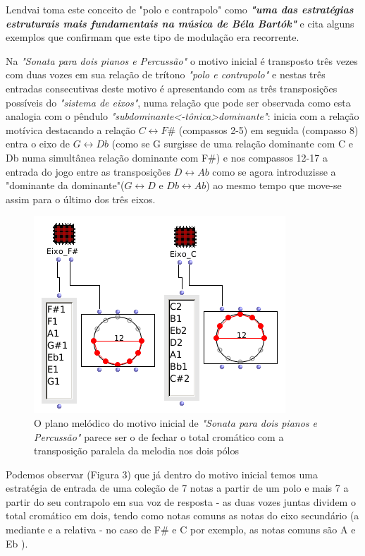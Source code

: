 \documentclass[
	12pt,				%
	openright,			%
	twoside,			%
	a4paper,			%
	english,			%
	french,				%
	spanish,			%
	brazil				%
	]{abntex2}
\begin{document}
Lendvai toma este conceito de "polo e contrapolo" como \textit{\textbf{"uma das estratégias estruturais mais fundamentais na música de Béla Bartók"}}\cite[ p.04]{lendvai1971bela} e cita alguns exemplos que confirmam que este tipo de modulação era recorrente.
\pagebreak 
 
Na \textit{"Sonata para dois pianos e Percussão"} o motivo inicial é transposto três vezes com duas vozes em sua relação de trítono \textit{"polo e contrapolo"} e nestas três entradas consecutivas deste motivo é apresentando com as três transposições possíveis do \textit{"sistema de eixos"}, numa relação que pode ser observada como esta analogia com o pêndulo \textit{"subdominante<-tônica>dominante"}: inicia com a relação motívica destacando a relação $C \leftrightarrow F\#$ (compassos 2-5) em seguida (compasso 8) entra o eixo de $G \leftrightarrow Db$ (como se G surgisse de uma relação dominante com C e Db numa simultânea relação dominante com F\#) e nos compassos 12-17 a entrada do jogo entre as transposições $D \leftrightarrow Ab$ como se agora introduzisse a "dominante da dominante"($G \leftrightarrow D$ e $Db \leftrightarrow Ab$) ao mesmo tempo que move-se assim para o último dos três eixos.

\begin{figure}[!h]
	\caption{\label{fig_grafico}O plano melódico do motivo inicial de \textit{"Sonata para dois pianos e Percussão"}  parece ser o de fechar o total cromático com a transposição paralela da melodia nos dois pólos }
	\begin{center}
	    \includegraphics[scale=0.7]{axis/sonata2P_OM.png}
	\end{center}
\end{figure}


Podemos observar (Figura 3) que já dentro do motivo inicial temos uma estratégia de entrada de uma coleção de 7 notas a partir de um polo e mais 7 a partir do seu contrapolo em sua voz de resposta - as duas vozes juntas dividem o total cromático em dois, tendo como notas comuns as notas do eixo secundário (a mediante e a relativa - no caso de F\# e C por exemplo, as notas comuns são A e Eb ).
\end{document}
